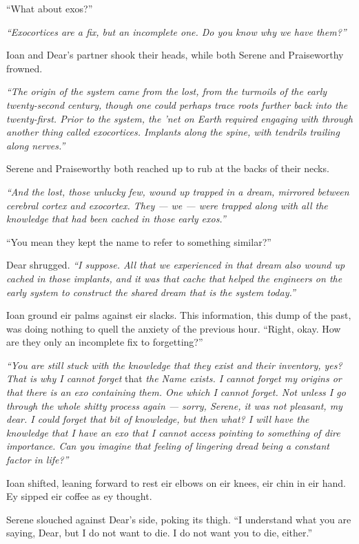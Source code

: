 ``What about exos?''

\emph{``Exocortices are a fix, but an incomplete one. Do you know why we have them?''}

Ioan and Dear's partner shook their heads, while both Serene and Praiseworthy frowned.

\emph{``The origin of the system came from the lost, from the turmoils of the early twenty-second century, though one could perhaps trace roots further back into the twenty-first. Prior to the system, the 'net on Earth required engaging with through another thing called exocortices. Implants along the spine, with tendrils trailing along nerves.''}

Serene and Praiseworthy both reached up to rub at the backs of their necks.

\emph{``And the lost, those unlucky few, wound up trapped in a dream, mirrored between cerebral cortex and exocortex. They — we — were trapped along with all the knowledge that had been cached in those early exos.''}

``You mean they kept the name to refer to something similar?''

Dear shrugged. \emph{``I suppose. All that we experienced in that dream also wound up cached in those implants, and it was that cache that helped the engineers on the early system to construct the shared dream that is the system today.''}

Ioan ground eir palms against eir slacks. This information, this dump of the past, was doing nothing to quell the anxiety of the previous hour. ``Right, okay. How are they only an incomplete fix to forgetting?''

\emph{``You are still stuck with the knowledge that they exist and their inventory, yes? That is why I cannot forget} that \emph{the Name exists. I cannot forget my origins or that there is an exo containing them. One which I cannot forget. Not unless I go through the whole shitty process again — sorry, Serene, it was not pleasant, my dear. I could forget that bit of knowledge, but then what? I will have the knowledge that I have an exo that I cannot access pointing to something of dire importance. Can you imagine that feeling of lingering dread being a constant factor in life?''}

Ioan shifted, leaning forward to rest eir elbows on eir knees, eir chin in eir hand. Ey sipped eir coffee as ey thought.

Serene slouched against Dear's side, poking its thigh. ``I understand what you are saying, Dear, but I do not want to die. I do not want you to die, either.''

